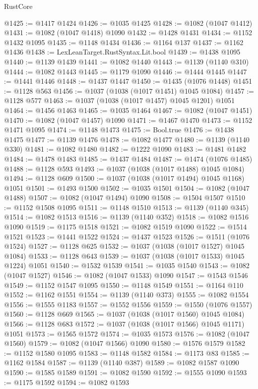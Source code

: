 \begin{lexlean}{RustCore}
\begin{coremodule}
@1425 := @1417 @1424
@1426 := @1035 @1425
@1428 := @1082 (@1047 @1412)
@1431 := @1082 (@1047 @1418) @1090
@1432 := @1428 @1431
@1434 := @1152 @1432 @1095
@1435 := @1148 @1434
@1436 := @1164 @137
@1437 := @1162 @1436
@1438 := LexLeanTarget.RustSyntax.Lit.bool
@1439 := @1438 @1095
@1440 := @1139 @1439
@1441 := @1082 @1440
@1443 := @1139 (@1140 @310)
@1444 := @1082 @1443
@1445 := @1179 @1090
@1446 := @1444 @1445
@1447 := @1441 @1446
@1448 := @1437 @1447
@1450 := @1435 (@1076 @1448)
@1451 := @1128 @563
@1456 := @1037 (@1038 (@1017 @1451) @1045 @1084)
@1457 := @1128 @577
@1463 := @1037 (@1038 (@1017 @1457) @1045 @1201) @1051
@1464 := @1456 @1463
@1465 := @1035 @1464
@1467 := @1082 (@1047 @1451)
@1470 := @1082 (@1047 @1457) @1090
@1471 := @1467 @1470
@1473 := @1152 @1471 @1095
@1474 := @1148 @1473
@1475 := Bool.true
@1476 := @1438 @1475
@1477 := @1139 @1476
@1478 := @1082 @1477
@1480 := @1139 (@1140 @330)
@1481 := @1082 @1480
@1482 := @1222 @1090
@1483 := @1481 @1482
@1484 := @1478 @1483
@1485 := @1437 @1484
@1487 := @1474 (@1076 @1485)
@1488 := @1128 @593
@1493 := @1037 (@1038 (@1017 @1488) @1045 @1084)
@1494 := @1128 @609
@1500 := @1037 (@1038 (@1017 @1494) @1045 @1168) @1051
@1501 := @1493 @1500
@1502 := @1035 @1501
@1504 := @1082 (@1047 @1488)
@1507 := @1082 (@1047 @1494) @1090
@1508 := @1504 @1507
@1510 := @1152 @1508 @1095
@1511 := @1148 @1510
@1513 := @1139 (@1140 @345)
@1514 := @1082 @1513
@1516 := @1139 (@1140 @352)
@1518 := @1082 @1516 @1090
@1519 := @1175 @1518
@1521 := @1082 @1519 @1090
@1522 := @1514 @1521
@1523 := @1441 @1522
@1524 := @1437 @1523
@1526 := @1511 (@1076 @1524)
@1527 := @1128 @625
@1532 := @1037 (@1038 (@1017 @1527) @1045 @1084)
@1533 := @1128 @643
@1539 := @1037 (@1038 (@1017 @1533) @1045 @1224) @1051
@1540 := @1532 @1539
@1541 := @1035 @1540
@1543 := @1082 (@1047 @1527)
@1546 := @1082 (@1047 @1533) @1090
@1547 := @1543 @1546
@1549 := @1152 @1547 @1095
@1550 := @1148 @1549
@1551 := @1164 @110
@1552 := @1162 @1551
@1554 := @1139 (@1140 @373)
@1555 := @1082 @1554
@1556 := @1555 @1183
@1557 := @1552 @1556
@1559 := @1550 (@1076 @1557)
@1560 := @1128 @669
@1565 := @1037 (@1038 (@1017 @1560) @1045 @1084)
@1566 := @1128 @683
@1572 := @1037 (@1038 (@1017 @1566) @1045 @1171) @1051
@1573 := @1565 @1572
@1574 := @1035 @1573
@1576 := @1082 (@1047 @1560)
@1579 := @1082 (@1047 @1566) @1090
@1580 := @1576 @1579
@1582 := @1152 @1580 @1095
@1583 := @1148 @1582
@1584 := @1173 @83
@1585 := @1162 @1584
@1587 := @1139 (@1140 @387)
@1589 := @1082 @1587 @1090
@1590 := @1585 @1589
@1591 := @1082 @1590
@1592 := @1555 @1090
@1593 := @1175 @1592
@1594 := @1082 @1593

\end{coremodule}
\end{lexlean}
